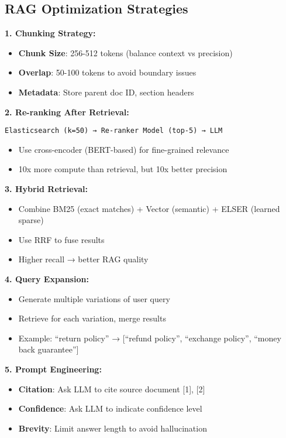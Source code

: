 \documentclass[10pt]{article}
\begin{document}
\subsection{RAG Optimization Strategies}

\textbf{1. Chunking Strategy:}
\begin{itemize}
\item \textbf{Chunk Size}: 256-512 tokens (balance context vs precision)
\item \textbf{Overlap}: 50-100 tokens to avoid boundary issues
\item \textbf{Metadata}: Store parent doc ID, section headers
\end{itemize}

\textbf{2. Re-ranking After Retrieval:}
\begin{verbatim}
Elasticsearch (k=50) → Re-ranker Model (top-5) → LLM
\end{verbatim}
\begin{itemize}
\item Use cross-encoder (BERT-based) for fine-grained relevance
\item 10x more compute than retrieval, but 10x better precision
\end{itemize}

\textbf{3. Hybrid Retrieval:}
\begin{itemize}
\item Combine BM25 (exact matches) + Vector (semantic) + ELSER (learned sparse)
\item Use RRF to fuse results
\item Higher recall → better RAG quality
\end{itemize}

\textbf{4. Query Expansion:}
\begin{itemize}
\item Generate multiple variations of user query
\item Retrieve for each variation, merge results
\item Example: ``return policy'' → [``refund policy'', ``exchange policy'', ``money back guarantee'']
\end{itemize}

\textbf{5. Prompt Engineering:}
\begin{itemize}
\item \textbf{Citation}: Ask LLM to cite source document [1], [2]
\item \textbf{Confidence}: Ask LLM to indicate confidence level
\item \textbf{Brevity}: Limit answer length to avoid hallucination
\end{itemize}
\end{document}
